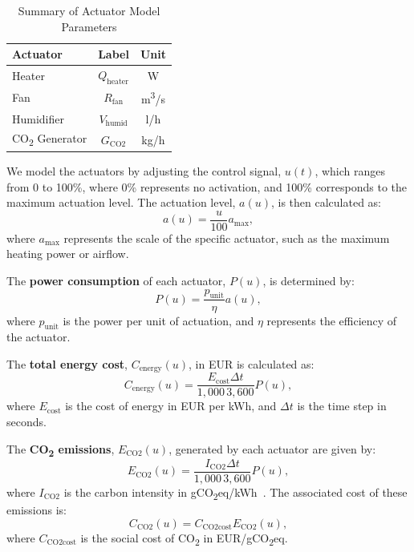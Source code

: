 \documentclass[conference]{IEEEtran}
\begin{document}
\begin{table}
    \centering
    \caption{Summary of Actuator Model Parameters}\label{tab:actuators}
    \begin{tabular}{lcc}
        \toprule
        Actuator                      & Label                   & Unit                   \\
        \midrule
        Heater                        & \( Q_{\text{heater}} \) & W                      \\
        Fan                           & \( R_{\text{fan}} \)    & m\textsuperscript{3}/s \\
        Humidifier                    & \( V_{\text{humid}} \)  & l/h                    \\
        CO\textsubscript{2} Generator & \( G_{\text{CO2}} \)    & kg/h                   \\
        \bottomrule
    \end{tabular}
\end{table}


We model the actuators by adjusting the control signal, \( u(t) \), which ranges from 0 to 100\%, where 0\% represents no activation, and 100\% corresponds to the maximum actuation level. The actuation level, \( a(u) \), is then calculated as:
\begin{equation}
    a(u) = \frac{u}{100}  a_{\text{max}},
\end{equation}
where \( a_{\text{max}} \) represents the scale of the specific actuator, such as the maximum heating power or airflow.

The \textbf{power consumption} of each actuator, \( P(u) \), is determined by:
\begin{equation}
    P(u) = \frac{p_{\text{unit}}}{\eta}  a(u),
\end{equation}
where \( p_{\text{unit}} \) is the power per unit of actuation, and \( \eta \) represents the efficiency of the actuator.

The \textbf{total energy cost}, \( C_{\text{energy}}(u) \), in EUR is calculated as:
\begin{equation}
    C_{\text{energy}}(u) = \frac{E_{\text{cost}}  \Delta t}{1,000 \, 3,600}  P(u),
\end{equation}
where \( E_{\text{cost}} \) is the cost of energy in EUR per kWh, and \( \Delta t \) is the time step in seconds.

The \textbf{CO\textsubscript{2} emissions}, \( E_{\text{CO2}}(u) \), generated by each actuator are given by:
\begin{equation}
    E_{\text{CO2}}(u) = \frac{I_{\text{CO2}}  \Delta t}{1,000  \, 3,600}  P(u),
\end{equation}
where \( I_{\text{CO2}} \) is the carbon intensity in gCO\textsubscript{2}eq/kWh~\cite{ElectricityMaps2022}. The associated cost of these emissions is:
\begin{equation}
    C_{\text{CO2}}(u) = C_{\text{CO2cost}}  E_{\text{CO2}}(u),
\end{equation}
where \( C_{\text{CO2cost}} \) is the social cost of CO\textsubscript{2} in EUR/gCO\textsubscript{2}eq.\\
\end{document}
